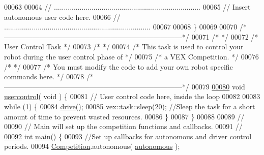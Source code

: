 \begin{DoxyCode}
00063   
00064   \textcolor{comment}{// ..........................................................................}
00065   \textcolor{comment}{// Insert autonomous user code here.}
00066   \textcolor{comment}{// ..........................................................................}
00067 
00068 \}
00069 
00070 \textcolor{comment}{/*---------------------------------------------------------------------------*/}
00071 \textcolor{comment}{/*                                                                           */}
00072 \textcolor{comment}{/*                              User Control Task                            */}
00073 \textcolor{comment}{/*                                                                           */}
00074 \textcolor{comment}{/*  This task is used to control your robot during the user control phase of */}
00075 \textcolor{comment}{/*  a VEX Competition.                                                       */}
00076 \textcolor{comment}{/*                                                                           */}
00077 \textcolor{comment}{/*  You must modify the code to add your own robot specific commands here.   */}
00078 \textcolor{comment}{/*---------------------------------------------------------------------------*/}
00079 
\mbox{\hyperlink{main_8cpp_a0b51ae97a13db57021eefe87a9903444_a0b51ae97a13db57021eefe87a9903444}{00080}} \textcolor{keywordtype}{void} \mbox{\hyperlink{main_8cpp_a0b51ae97a13db57021eefe87a9903444_a0b51ae97a13db57021eefe87a9903444}{usercontrol}}( \textcolor{keywordtype}{void} ) \{
00081   \textcolor{comment}{// User control code here, inside the loop}
00082 
00083   \textcolor{keywordflow}{while} (1) \{
00084     \mbox{\hyperlink{drive_8h_a928e32686c7e00c1ecde24c3da3019f7_a928e32686c7e00c1ecde24c3da3019f7}{drive}}();
00085     vex::task::sleep(20); \textcolor{comment}{//Sleep the task for a short amount of time to prevent wasted resources. }
00086   \}
00087 \}
00088 
00089 \textcolor{comment}{//}
00090 \textcolor{comment}{// Main will set up the competition functions and callbacks.}
00091 \textcolor{comment}{//}
\mbox{\hyperlink{main_8cpp_ae66f6b31b5ad750f1fe042a706a4e3d4_ae66f6b31b5ad750f1fe042a706a4e3d4}{00092}} \textcolor{keywordtype}{int} \mbox{\hyperlink{main_8cpp_ae66f6b31b5ad750f1fe042a706a4e3d4_ae66f6b31b5ad750f1fe042a706a4e3d4}{main}}() \{
00093     \textcolor{comment}{//Set up callbacks for autonomous and driver control periods.}
00094     \mbox{\hyperlink{main_8cpp_ae38c1d025caf302610a55e0a7a9db5dd_ae38c1d025caf302610a55e0a7a9db5dd}{Competition}}.autonomous( \mbox{\hyperlink{main_8cpp_a2df3d06bc5bced154da27fce393f991f_a2df3d06bc5bced154da27fce393f991f}{autonomous}} );

\end{DoxyCode}
